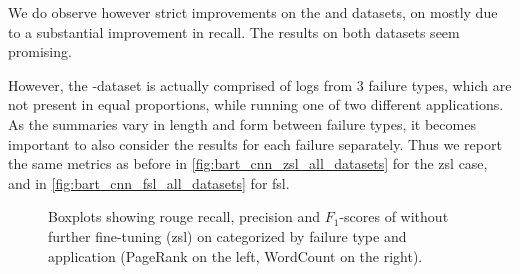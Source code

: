 We do observe however strict improvements on the \hadoop{} and \logsummary{} datasets,
on \hadoop{} mostly due to a substantial improvement in recall.
The results on both datasets seem promising.

However, the \hadoop{}-dataset is actually comprised of logs from 3 failure types,
which are not present in equal proportions, while running one of two different applications.
As the summaries vary in length and form between failure types,
it becomes important to also consider the results for each failure separately.
Thus we report the same metrics as before
in \autoref{fig:bart_cnn_zsl_all_datasets} for  the \ac{zsl} case,
and in \autoref{fig:bart_cnn_fsl_all_datasets} for \ac{fsl}.

\begin{figure}[b]
\centering
{}%
\hfill{}%
%
\hfill{}%
\caption[Boxplots showing \acs*{rouge} recall, precision and \(F_1\)-scores
of  without further fine-tuning (\acs*{zsl}) on \hadoop{} categorized by failure type and application.]{Boxplots showing \acs*{rouge} recall, precision and \(F_1\)-scores
of  without further fine-tuning (\acs*{zsl}) on \hadoop{} categorized by failure type and application (PageRank on the left, WordCount on the right).}
\label{fig:bart_cnn_zsl_hadoop}
\end{figure}

